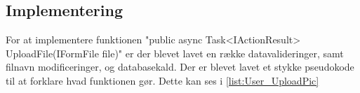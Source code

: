 \subsection{Implementering}

For at implementere funktionen "public async Task<IActionResult> UploadFile(IFormFile file)" er der blevet lavet en række datavalideringer, samt filnavn modificeringer, og databasekald. Der er blevet lavet et stykke pseudokode til at forklare hvad funktionen gør. Dette kan ses i \ref{list:User_UploadPic}

